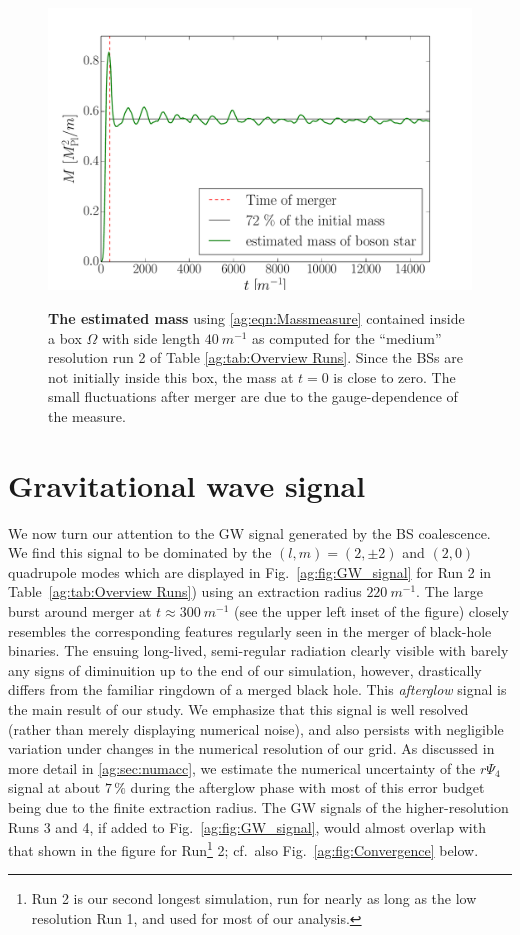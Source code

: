 \begin{figure}[h!]
\begin{center}
    {\includegraphics[width=0.7\columnwidth]{ag_fig/mass_over_time.pdf}}
    \caption{{\bf The estimated mass} using \ref{ag:eqn:Massmeasure} 
    contained inside a box $\Omega$ with side length $40~m^{-1}$ as computed for the ``medium'' 
    resolution run 2 of Table \ref{ag:tab:Overview Runs}. 
    Since the BSs are
    not initially inside this box, the mass at $t = 0$ is close to zero. The small fluctuations after merger
   are due to the gauge-dependence of the measure.
   }
\label{ag:fig:energy}
\end{center}
\end{figure}







\section{Gravitational wave signal}\label{ag:sec:GWs}



We now turn our attention to the GW signal generated by the
BS coalescence. We find this signal to be dominated by the
$(l,m)=(2,\pm 2)$ and $(2,0)$ quadrupole modes which are
displayed in Fig.~\ref{ag:fig:GW_signal} for Run 2 in Table~\ref{ag:tab:Overview Runs}) using an extraction
radius $220~m^{-1}$. The large burst around merger at $t\approx300~m^{-1}$ (see the upper left inset of the figure)
closely resembles the corresponding features
regularly seen in the merger of black-hole binaries.
The ensuing long-lived, semi-regular radiation clearly visible
with barely any signs of diminuition up to the end of our
simulation, however, drastically
differs from the familiar ringdown of a merged black hole. This
{\it afterglow} signal is the main result of our study. We
emphasize that this signal is well resolved (rather than
merely displaying numerical noise), and also persists with
negligible variation under changes in the numerical resolution
of our grid. As discussed in more detail in
\ref{ag:sec:numacc}, we estimate the numerical uncertainty
of the $r\Psi_4$ signal at about $7\,\%$ during the afterglow phase
with most of this error budget being due to the finite extraction radius.
The GW signals of the higher-resolution Runs 3 and 4, if added
to Fig.~\ref{ag:fig:GW_signal}, would almost overlap with
that shown in the figure for Run\footnote{Run 2 is our second longest simulation, run for nearly as long as the low resolution Run 1,
and used for most of our analysis.} 2;
cf.~also Fig.~\ref{ag:fig:Convergence} below.

